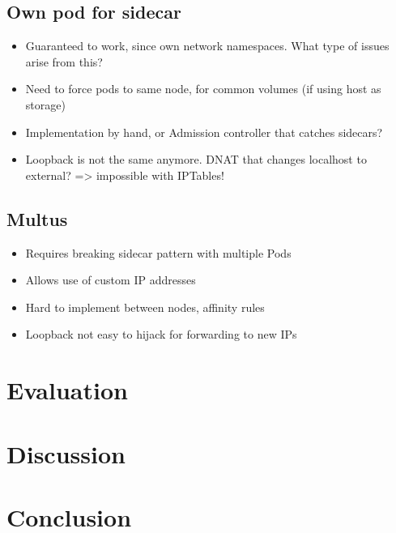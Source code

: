 \documentclass[english,12pt,a4paper,pdftex,sci,utf8]{aaltothesis}
\begin{document}
\subsection{Own pod for sidecar}

\begin{itemize}
  \item Guaranteed to work, since own network namespaces. What type of issues arise from this?
  \item Need to force pods to same node, for common volumes (if using host as storage)
  \item Implementation by hand, or Admission controller that catches sidecars?
  \item Loopback is not the same anymore. DNAT that changes localhost to external? => impossible with IPTables!
\end{itemize}

\subsection{Multus}

\begin{itemize}
  \item Requires breaking sidecar pattern with multiple Pods
  \item Allows use of custom IP addresses
  \item Hard to implement between nodes, affinity rules
  \item Loopback not easy to hijack for forwarding to new IPs
\end{itemize}

\clearpage

\section{Evaluation} \label{section-solution}

\clearpage

\section{Discussion} \label{section-discussion}

\clearpage

\section{Conclusion} \label{section-conclusion}

\clearpage
\end{document}
